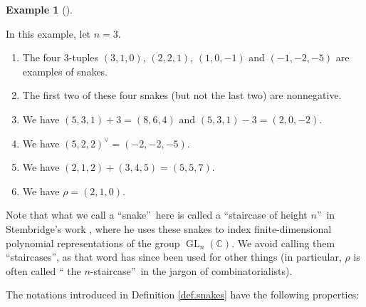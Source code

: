 \documentclass[numbers=enddot,12pt,final,onecolumn,notitlepage]{scrartcl}%
\theoremstyle{definition}
\newtheorem{exam}[theo]{Example}
\newenvironment{example}[1][]
{\begin{exam}[#1]\begin{leftbar}}
{\end{leftbar}\end{exam}}
\begin{document}
\begin{example}
In this example, let $n=3$.

\begin{enumerate}
\item[\textbf{(a)}] The four $3$-tuples $\left(  3,1,0\right)  $, $\left(
2,2,1\right)  $, $\left(  1,0,-1\right)  $ and $\left(  -1,-2,-5\right)  $ are
examples of snakes.

\item[\textbf{(b)}] The first two of these four snakes (but not the last two)
are nonnegative.

\item[\textbf{(c)}] We have $\left(  5,3,1\right)  +3=\left(  8,6,4\right)  $
and $\left(  5,3,1\right)  -3=\left(  2,0,-2\right)  $.

\item[\textbf{(d)}] We have $\left(  5,2,2\right)  ^{\vee}=\left(
-2,-2,-5\right)  $.

\item[\textbf{(e)}] We have $\left(  2,1,2\right)  +\left(  3,4,5\right)
=\left(  5,5,7\right)  $.

\item[\textbf{(f)}] We have $\rho=\left(  2,1,0\right)  $.
\end{enumerate}
\end{example}

Note that what we call a \textquotedblleft snake\textquotedblright\ here is
called a \textquotedblleft staircase of height $n$\textquotedblright\ in
Stembridge's work \cite{Stembr87}, where he uses these snakes to index
finite-dimensional polynomial representations of the group $\operatorname*{GL}%
\nolimits_{n}\left(  \mathbb{C}\right)  $. We avoid calling them
\textquotedblleft staircases\textquotedblright, as that word has since been
used for other things (in particular, $\rho$ is often called \textquotedblleft
the $n$-staircase\textquotedblright\ in the jargon of combinatorialists).

The notations introduced in Definition \ref{def.snakes} have the following properties:
\end{document}
